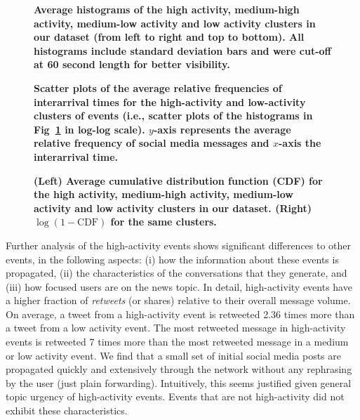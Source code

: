 \documentclass[10pt,letterpaper]{article}
\begin{document}
%

\begin{figure}[!htb]
  \centering
  \caption{\textbf{Average histograms of the high activity,
      medium-high activity, medium-low activity and low activity
      clusters in our dataset (from left to right and top to
      bottom). All histograms include standard deviation bars and were
      cut-off at 60 second length for better visibility.
    }}\label{fig:fig4}
\end{figure}

\begin{figure}[!htb]
  \centering
  \caption{\textbf{Scatter plots of the average relative frequencies of interarrival times
for the high-activity and low-activity clusters of events (i.e., scatter
plots of the histograms in Fig~\ref{fig:fig4} in log-log scale). $y$-axis
represents the average relative frequency of social media messages and
$x$-axis the interarrival time.
    }}\label{fig:fig5}
\end{figure}

\begin{figure}[!htb]
  \centering
  \caption{\textbf{(Left) Average cumulative distribution function (CDF) for
the high activity, medium-high activity, medium-low activity and low activity clusters in our dataset.
(Right) $\log{(1 - \mathrm{CDF})}$ for the same clusters. 
    }}\label{fig:fig6} %
\end{figure}

Further analysis of the high-activity events shows significant
differences to other events, in the following aspects: (i) how the
information about these events is propagated, (ii) the characteristics
of the conversations that they generate, and (iii) how focused users
are on the news topic. In detail, high-activity events have a higher
fraction of {\em retweets} (or shares) relative to their overall
message volume. On average, a tweet from a high-activity event is
retweeted 2.36 times more than a tweet from a low activity event. The
most retweeted message in high-activity events is retweeted 7 times more
than the most retweeted message in a medium or low activity event. We
find that a small set of initial social media posts are propagated
quickly and extensively through the network without any rephrasing by
the user (just plain forwarding). Intuitively, this seems justified given
general topic urgency of high-activity events. Events that are not
high-activity did not exhibit these characteristics.
\end{document}
